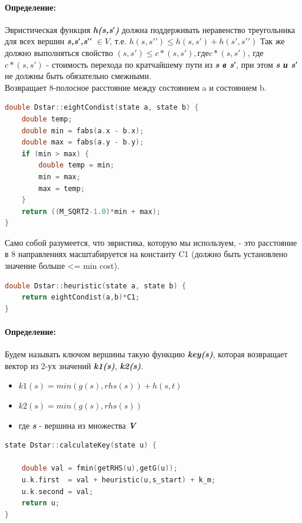\documentclass[12pt]{article}
\begin{document}
\paragraph{Определение:}
Эвристическая функция \textbf{\emph{h(s,s′)}} должна поддерживать неравенство треугольника для всех вершин \textbf{\emph{s,s′,s′′}} $\in V$, т.е. $h(s,s′′)\leq h(s,s′)+h(s′,s′′)$
Так же должно выполняться свойство $(s,s′) \leq c*(s,s′), где c*(s,s′)$, где $c*(s,s′)$ - стоимость перехода по кратчайшему пути из \textbf{\emph{s в s′}}, при этом \textbf{\emph{s и s′}} не должны быть обязательно смежными. \\
Возвращает 8-полосное расстояние между состоянием a и состоянием b.
\begin{lstlisting}[language=C,style=C]
double Dstar::eightCondist(state a, state b) {
    double temp;
    double min = fabs(a.x - b.x);
    double max = fabs(a.y - b.y);
    if (min > max) {
        double temp = min;
        min = max;
        max = temp;
    }
    return ((M_SQRT2-1.0)*min + max);
}
\end{lstlisting}
Само собой разумеется, что эвристика, которую мы используем, - это расстояние в 8 направлениях масштабируется на константу C1 (должно быть установлено значение больше <= min cost).
\begin{lstlisting}[language=C,style=C]
double Dstar::heuristic(state a, state b) {
    return eightCondist(a,b)*C1;
}
\end{lstlisting}

\paragraph{Определение:}
Будем называть ключом вершины такую функцию \textbf{\emph{key(s)}}, которая возвращает вектор из 2-ух значений \textbf{\emph{k1(s)}}, \textbf{\emph{k2(s)}}.
\begin{itemize}
    \item $k1(s)=min(g(s),rhs(s))+h(s,t)$
    \item $k2(s)=min(g(s),rhs(s))$
    \item где \textbf{\emph{s}} - вершина из множества \textbf{\emph{V}}
\end{itemize}

\begin{lstlisting}[language=C,style=C]
state Dstar::calculateKey(state u) {

    double val = fmin(getRHS(u),getG(u));
    u.k.first  = val + heuristic(u,s_start) + k_m;
    u.k.second = val;
    return u;
}
\end{lstlisting}
\end{document}
